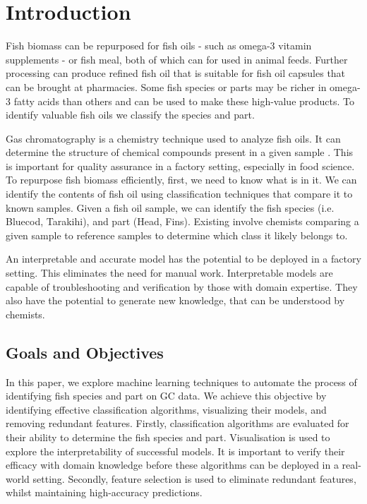 \documentclass[runningheads]{llncs}
\begin{document}
\section{Introduction}
\label{introduction}


Fish biomass can be repurposed for fish oils - such as omega-3 vitamin supplements - or fish meal, both of which can for used in animal feeds. 
Further processing can produce refined fish oil that is suitable for fish oil capsules that can be brought at pharmacies. 
Some fish species or parts may be richer in omega-3 fatty acids than others and can be used to make these high-value products. 
To identify valuable fish oils we classify the species and part. 

Gas chromatography \cite{eder1995gas} is a chemistry technique used to analyze fish oils. 
It can determine the structure of chemical compounds present in a given sample \cite{restek2018high}. 
This is important for quality assurance in a factory setting, especially in food science. 
To repurpose fish biomass efficiently, first, we need to know what is in it. 
We can identify the contents of fish oil using classification techniques that compare it to known samples. 
Given a fish oil sample, we can identify the fish species (i.e. Bluecod, Tarakihi), and part (Head, Fins).
Existing involve chemists comparing a given sample to reference samples to determine which class it likely belongs to. 

An interpretable and accurate model has the potential to be deployed in a factory setting.
This eliminates the need for manual work.
Interpretable models are capable of troubleshooting and verification by those with domain expertise. 
They also have the potential to generate new knowledge, that can be understood by chemists. 

\subsection{Goals and Objectives}

In this paper, we explore machine learning techniques to automate the process of identifying fish species and part on GC data. 
We achieve this objective by identifying effective classification algorithms, visualizing their models, and removing redundant features. 
Firstly, classification algorithms are evaluated for their ability to determine the fish species and part. 
Visualisation is used to explore the interpretability of successful models.
It is important to verify their efficacy with domain knowledge before these algorithms can be deployed in a real-world setting.
Secondly, feature selection is used to eliminate redundant features, whilst maintaining high-accuracy predictions. 
\end{document}
